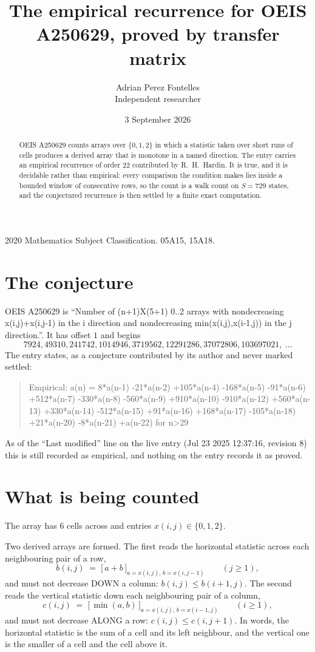 \documentclass[11pt,a4paper]{article}
\title{The empirical recurrence for OEIS A250629, proved by transfer matrix}
\author{Adrian Perez Fontelles\\ \small Independent researcher}
\date{3 September 2026}
\theoremstyle{plain}
\theoremstyle{definition}
\begin{document}
\maketitle

\begin{abstract}
OEIS A250629 counts arrays over $\{0,1,2\}$ in which a statistic taken over short runs
of cells produces a derived array that is monotone in a named direction. The entry carries an
empirical recurrence of order $22$ contributed by R.~H.~Hardin. It is true, and it is
decidable rather than empirical: every comparison the condition makes lies inside a bounded
window of consecutive rows, so the count is a walk count on $S=729$ states, and the
conjectured recurrence is then settled by a finite exact computation.
\end{abstract}

\noindent\small 2020 Mathematics Subject Classification. 05A15, 15A18.\normalsize

\section{The conjecture}

OEIS A250629 is ``Number of (n+1)X(5+1) 0..2 arrays with nondecreasing x(i,j)+x(i,j-1) in the i direction and nondecreasing min(x(i,j),x(i-1,j)) in the j direction.''. It has offset $1$ and begins
\[
7924, 49310, 241742, 1014946, 3719562, 12291286, 37072806, 103697021,\ \dots
\]
The entry states, as a conjecture contributed by its author and never marked settled:
\begin{quote}
Empirical: a(n) = 8*a(n-1) -21*a(n-2) +105*a(n-4) -168*a(n-5) -91*a(n-6) +512*a(n-7) -330*a(n-8) -560*a(n-9) +910*a(n-10) -910*a(n-12) +560*a(n-13) +330*a(n-14) -512*a(n-15) +91*a(n-16) +168*a(n-17) -105*a(n-18) +21*a(n-20) -8*a(n-21) +a(n-22) for n>29
\end{quote}
As of the ``Last modified'' line on the live entry (Jul 23 2025 12:37:16, revision 8) this is still
recorded as empirical, and nothing on the entry records it as proved.

\section{What is being counted}

The array has $6$ cells across and entries $x(i,j)\in\{0,1,2\}$.

Two derived arrays are formed. The first reads the horizontal statistic across each
neighbouring pair of a row,
\[
b(i,j)\;=\;\bigl[\,a+b\,\bigr]_{a=x(i,j),\,b=x(i,j-1)}\qquad (j\ge1),
\]
and must not decrease DOWN a column: $b(i,j)\le b(i{+}1,j)$. The second reads the vertical
statistic down each neighbouring pair of a column,
\[
c(i,j)\;=\;\bigl[\,\min(a,b)\,\bigr]_{a=x(i,j),\,b=x(i{-}1,j)}\qquad (i\ge1),
\]
and must not decrease ALONG a row: $c(i,j)\le c(i,j{+}1)$. In words, the horizontal statistic
is the sum of a cell and its left neighbour, and the vertical one is
the smaller of a cell and the cell above it.
\end{document}
